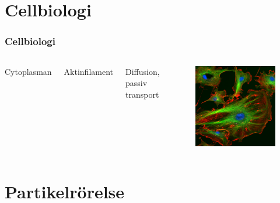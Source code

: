 \documentclass[swedish]{beamer}
\begin{document}
\section{Cellbiologi}%
\begin{frame}
\frametitle{Cellbiologi}
 \begin{columns}[c]


Cytoplasman
\vspace{8mm}

Aktinfilament
\vspace{8mm}

Diffusion, passiv transport


\begin{figure} %
\includegraphics[width=1\textwidth]{figures/FluorescentCells.png}
\end{figure}

\end{columns}
\end{frame}



\section{Partikelrörelse}
\end{document}
